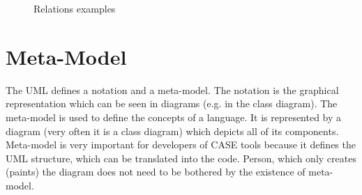 \begin{figure}[!ht]
\begin{center}
\caption{Relations examples}
\label{f-relationExamples}
\end{center}
\end{figure}

\section{Meta-Model}

The UML defines a notation and a meta-model. The notation is the graphical representation which can be seen in diagrams (e.g. in the class diagram). The meta-model is used to define the concepts of a language. It is represented by a diagram (very often it is a class diagram) which depicts all of its components. Meta-model is very important for developers of CASE tools because it defines the UML structure, which can be translated into the code. Person, which only creates (paints) the diagram does not need to be bothered by the existence of meta-model.


